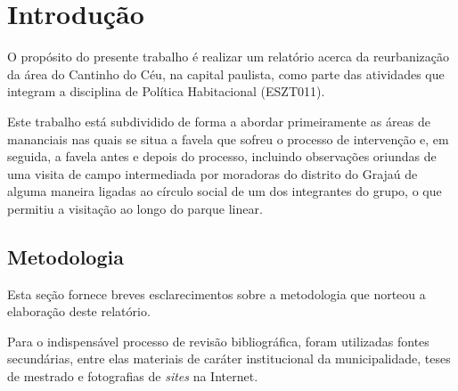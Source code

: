 	
	
	\tableofcontents 
	\newpage \listoffigures
	\newpage \listoftables
	\textual
	
	
	
	
	\chapter{Introdução}
	
	O propósito do presente trabalho é realizar um relatório acerca da reurbanização da área do Cantinho do Céu, na capital paulista, como parte das atividades que integram a disciplina de Política Habitacional (ESZT011).
	
	Este trabalho está subdividido de forma a abordar primeiramente as áreas de mananciais nas quais se situa a favela que sofreu o processo de intervenção e, em seguida, a favela antes e depois do processo, incluindo observações oriundas de uma visita de campo intermediada por moradoras do distrito do Grajaú de alguma maneira ligadas ao círculo social de um dos integrantes do grupo, o que permitiu a visitação ao longo do parque linear.
	
	\section{Metodologia}
	
	Esta seção fornece breves esclarecimentos sobre a metodologia que norteou a elaboração deste relatório.
	
	Para o indispensável processo de revisão bibliográfica, foram utilizadas fontes secundárias, entre elas materiais de caráter institucional da municipalidade, teses de mestrado e fotografias de \textit{sites} na Internet.
	
